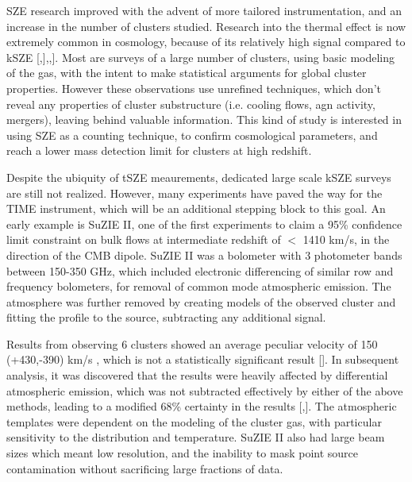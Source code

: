 \documentclass[manuscript]{aastex}
\begin{document}
SZE research improved with the advent of more tailored instrumentation, and an increase in the number of clusters studied. Research into the thermal effect is now extremely common in cosmology, because of its relatively high signal compared to kSZE [\cite{Benson2013},\cite{Saliwanchik2015}],\cite{Bleem2015},\cite{Planck2016}]. Most are surveys of a large number of clusters, using basic modeling of the gas, with the intent to make statistical arguments for global cluster properties. However these observations use unrefined techniques, which don't reveal any properties of cluster substructure (i.e. cooling flows, agn activity, mergers), leaving behind valuable information. This kind of study is interested in using SZE as a counting technique, to confirm cosmological parameters, and reach a lower mass detection limit for clusters at high redshift. 

Despite the ubiquity of tSZE meaurements, dedicated large scale kSZE surveys are still not realized. However, many experiments have paved the way for the TIME instrument, which will be an additional stepping block to this goal. An early example is SuZIE II, one of the first experiments to claim a 95\% confidence limit constraint on bulk flows at intermediate redshift of \(<\) 1410 km/s, in the direction of the CMB dipole. SuZIE II was a bolometer with 3 photometer bands between 150-350 GHz, which included electronic differencing of similar row and frequency bolometers, for removal of common mode atmospheric emission. The atmosphere was further removed by creating models of the observed cluster and fitting the profile to the source, subtracting any additional signal. 

Results from observing 6 clusters showed an average peculiar velocity of 150 (+430,-390) km/s , which is not a statistically significant result [\cite{Benson2003}]. In subsequent analysis, it was discovered that the results were heavily affected by differential atmospheric emission, which was not subtracted effectively by either of the above methods, leading to a modified 68\% certainty in the results [\cite{Mauskopf2000},\cite{Carlstrom2002}]. The atmospheric templates were dependent on the modeling of the cluster gas, with particular sensitivity to the distribution and temperature. SuZIE II also had large beam sizes which meant low resolution, and the inability to mask point source contamination without sacrificing large fractions of data. 
\end{document}
